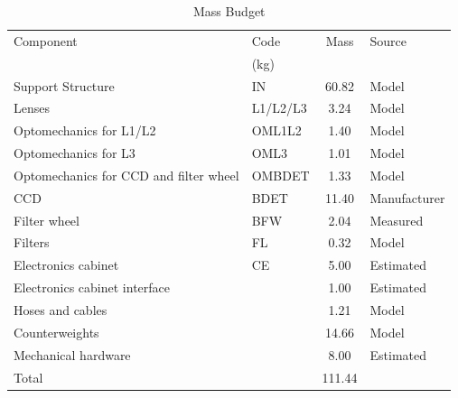 \documentclass{article}
\begin{document}
\begin{table}[p]
\caption{Mass Budget}
\label{table:mass}
\begin{center}
\begin{tabular}{llcl}
\hline
Component&Code&Mass&Source\\
&(kg)&\\
\hline
Support Structure                      &IN       &\phantom{0}60.82&Model\\
Lenses                                 &L1/L2/L3 &\phantom{00}3.24&Model\\
Optomechanics for L1/L2                &OML1L2   &\phantom{00}1.40&Model\\
Optomechanics for L3                   &OML3     &\phantom{00}1.01&Model\\
Optomechanics for CCD and filter wheel &OMBDET   &\phantom{00}1.33&Model\\
CCD                                    &BDET     &\phantom{0}11.40&Manufacturer\\
Filter wheel                           &BFW      &\phantom{00}2.04&Measured\\
Filters                                &FL       &\phantom{00}0.32&Model\\
Electronics cabinet                    &CE       &\phantom{00}5.00&Estimated\\
Electronics cabinet interface          &         &\phantom{00}1.00&Estimated\\
Hoses and cables                       &         &\phantom{00}1.21&Model\\
Counterweights                         &         &\phantom{0}14.66&Model\\
Mechanical hardware                    &         &\phantom{00}8.00&Estimated\\
\hline
Total                                  &         &\phantom{}111.44\\

\end{tabular}
\end{center}
\end{table}
\end{document}

